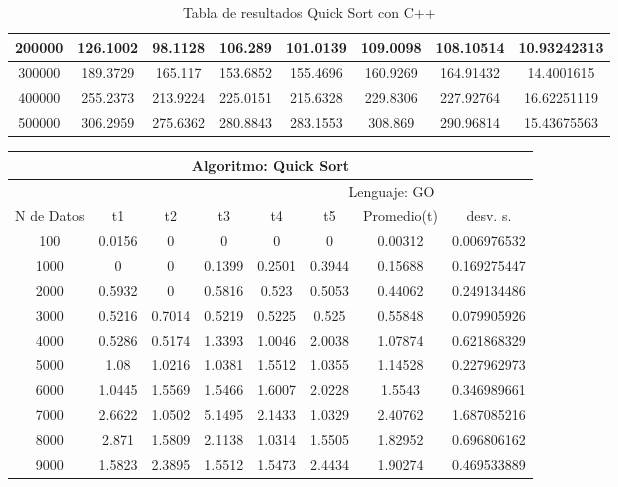 \documentclass{article}
\begin{document}
\begin{table}[]
\begin{tabular}{|c|c|c|c|c|c|c|c| }
                200000	&126.1002	&98.1128	    &106.289	    &101.0139	&109.0098&	108.10514&	10.93242313 \\ \hline
                300000	&189.3729	&165.117	    &153.6852	&155.4696	&160.9269&	164.91432&	14.4001615 \\ \hline
                400000	&255.2373	&213.9224	&225.0151	&215.6328	&229.8306&	227.92764&	16.62251119 \\ \hline
                500000	&306.2959	&275.6362	&280.8843	&283.1553	&308.869	 &    290.96814&	15.43675563 \\ \hline
        \end{tabular}
           \caption{Tabla de resultados Quick Sort con C++}
        \label{tab:quickSortC}
    \end{table}
        \begin{table}[]
        \begin{tabular}{|c|c|c|c|c|c|c|c| }
            \hline
            \multicolumn{8}{|c|}{Algoritmo: Quick Sort} \\ \hline
            \multicolumn{4}{|c|}{} & \multicolumn{4}{c|}{Lenguaje: GO} \\ \hline
              N de Datos &     t1    &  t2         &  t3          &   t4        &    t5     &   Promedio(t)       & desv. s. \\ \hline
                100	&0.0156&0	&0	&0	&0	&0.00312	&0.006976532\\ \hline
                1000	&0	&0	&0.1399	&0.2501	&0.3944	&0.15688	&0.169275447\\ \hline
                2000	&0.5932	&0	&0.5816	&0.523	&0.5053	&0.44062	&0.249134486\\ \hline
                3000	&0.5216	&0.7014	&0.5219	&0.5225	&0.525	&0.55848	&0.079905926\\ \hline
                4000	&0.5286	&0.5174	&1.3393	&1.0046	&2.0038	&1.07874	&0.621868329\\ \hline
                5000	&1.08	&1.0216	&1.0381	&1.5512	&1.0355	&1.14528	&0.227962973\\ \hline
                6000	&1.0445	&1.5569	&1.5466	&1.6007	&2.0228	&1.5543	&0.346989661\\ \hline
                7000	&2.6622	&1.0502	&5.1495	&2.1433	&1.0329	&2.40762	&1.687085216\\ \hline
                8000	&2.871	&1.5809	&2.1138	&1.0314	&1.5505	&1.82952	&0.696806162\\ \hline
                9000	&1.5823	&2.3895	&1.5512	&1.5473	&2.4434	&1.90274	&0.469533889\\ \hline

\end{tabular}
\end{table}
\end{document}
